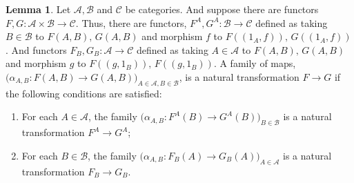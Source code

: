 \documentclass[18pt,a4paper]{article}
\theoremstyle{definition}
\newtheorem{lemma}[theorem]{Lemma}
\begin{document}
	\begin{lemma}
		Let $\mathcal{A},\mathcal{B}$ and $\mathcal{C}$ be categories. And suppose there
		are functors $F,G:\mathcal{A} \times \mathcal{B} \to \mathcal{C}$.
		Thus, there are functors, $F^A,G^A:\mathcal{B} \to \mathcal{C}$ defined as
		taking $B \in \mathcal{B}$ to $F(A,B),\, G(A,B)$ and
		morphism $f$ to $F((1_A,f)),\, G((1_A,f)) $. And functors
		$F_B,G_B:\mathcal{A} \to \mathcal{C}$ defined as
		taking $A \in \mathcal{A} $ to $F(A,B),\, G(A,B)$ and
		morphism $g$ to $F((g,1_B)),\, F((g,1_B))$.
		A family of maps, $\big( \alpha_{A,B}: F(A,B) \to G(A,B)
		\big)_{A \in \mathcal{A} , B \in \mathcal{B} } $, is a natural transformation
		$F \to G$ if the following conditions are satisfied:
		\begin{enumerate}[label=(\roman*)]
			\item For each $A \in \mathcal{A}$, the family
		$\big( \alpha_{A,B}: F^A(B) \to G^A(B) \big)_{ B \in \mathcal{B} } $ is
		a natural transformation $F^A \to G^A$;
			\item For each $B \in \mathcal{B}$, the family
		$\big( \alpha_{A,B}: F_B(A) \to G_B(A) \big)_{ A \in \mathcal{A} } $ is
		a natural transformation $F_B \to G_B$.
		\end{enumerate}
	\end{lemma}
\end{document}
